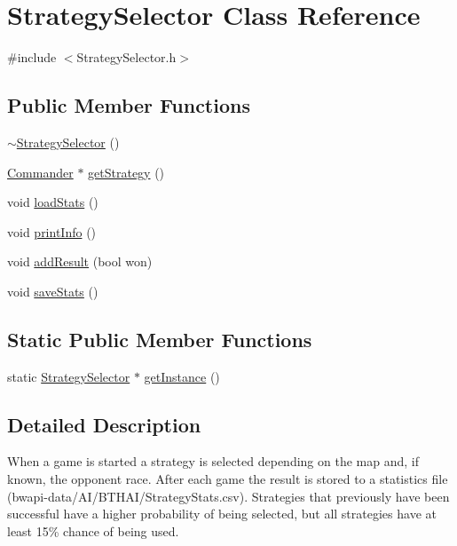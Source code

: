 \hypertarget{class_strategy_selector}{\section{Strategy\-Selector Class Reference}
\label{class_strategy_selector}
}


{\ttfamily \#include $<$Strategy\-Selector.\-h$>$}

\subsection*{Public Member Functions}
\begin{DoxyCompactItemize}
\item 
\hyperlink{class_strategy_selector_ad0583333556509ae239885e310e6f5d2}{$\sim$\-Strategy\-Selector} ()
\item 
\hyperlink{class_commander}{Commander} $\ast$ \hyperlink{class_strategy_selector_a44e9f0fcca6f9efce33a81647311d02b}{get\-Strategy} ()
\item 
void \hyperlink{class_strategy_selector_a987d3e0280e28ea2e61a5dac17e57595}{load\-Stats} ()
\item 
void \hyperlink{class_strategy_selector_a19e9e46f32820cc63111bf3e98e0ea15}{print\-Info} ()
\item 
void \hyperlink{class_strategy_selector_a7bb1e4ec14885dc6bae4bb2b910e4e39}{add\-Result} (bool won)
\item 
void \hyperlink{class_strategy_selector_a05d2c492efaffadbabf339efefcd98b6}{save\-Stats} ()
\end{DoxyCompactItemize}
\subsection*{Static Public Member Functions}
\begin{DoxyCompactItemize}
\item 
static \hyperlink{class_strategy_selector}{Strategy\-Selector} $\ast$ \hyperlink{class_strategy_selector_a30eb026989e78bd89dbcc3006a9d5753}{get\-Instance} ()
\end{DoxyCompactItemize}


\subsection{Detailed Description}
When a game is started a strategy is selected depending on the map and, if known, the opponent race. After each game the result is stored to a statistics file (bwapi-\/data/\-A\-I/\-B\-T\-H\-A\-I/\-Strategy\-Stats.\-csv). Strategies that previously have been successful have a higher probability of being selected, but all strategies have at least 15\% chance of being used.


